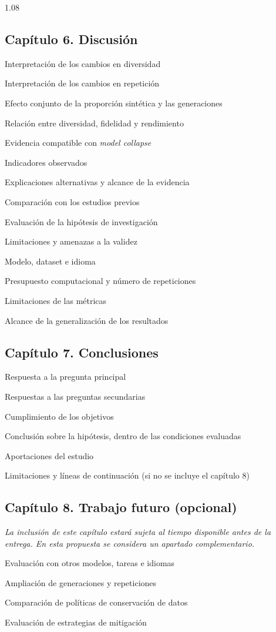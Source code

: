 \documentclass[12pt,letterpaper]{article}
\newcommand{\numerocap}{1}
\newcommand{\capitulo}[2]{\renewcommand{\numerocap}{#1}\Needspace{5\baselineskip}\subsection*{Capítulo #1. #2}}
\begin{document}
\begin{spacing}{1.08}
\capitulo{6}{Discusión}
\begin{apartados}
\item Interpretación de los cambios en diversidad
\item Interpretación de los cambios en repetición
\item Efecto conjunto de la proporción sintética y las generaciones
\item Relación entre diversidad, fidelidad y rendimiento
\item Evidencia compatible con \textit{model collapse}
\begin{apartados}
\item Indicadores observados
\item Explicaciones alternativas y alcance de la evidencia
\end{apartados}
\item Comparación con los estudios previos
\item Evaluación de la hipótesis de investigación
\item Limitaciones y amenazas a la validez
\begin{apartados}
\item Modelo, dataset e idioma
\item Presupuesto computacional y número de repeticiones
\item Limitaciones de las métricas
\item Alcance de la generalización de los resultados
\end{apartados}
\end{apartados}

\capitulo{7}{Conclusiones}
\begin{apartados}
\item Respuesta a la pregunta principal
\item Respuestas a las preguntas secundarias
\item Cumplimiento de los objetivos
\item Conclusión sobre la hipótesis, dentro de las condiciones evaluadas
\item Aportaciones del estudio
\item Limitaciones y líneas de continuación (si no se incluye el capítulo 8)
\end{apartados}

\capitulo{8}{Trabajo futuro (opcional)}
\noindent\textit{La inclusión de este capítulo estará sujeta al tiempo
disponible antes de la entrega. En esta propuesta se considera un apartado
complementario.}
\begin{apartados}
\item Evaluación con otros modelos, tareas e idiomas
\item Ampliación de generaciones y repeticiones
\item Comparación de políticas de conservación de datos
\item Evaluación de estrategias de mitigación
\end{apartados}


\end{spacing}
\end{document}
